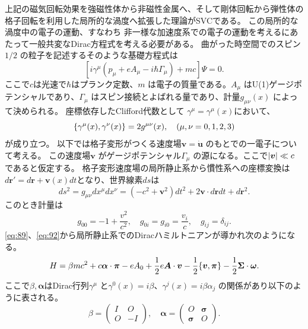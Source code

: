 \documentclass[dvipdfmx]{jsreport}
\numberwithin{equation}{chapter}
\numberwithin{table}{chapter}
\begin{document}
上記の磁気回転効果を強磁性体から非磁性金属へ、そして剛体回転から弾性体の格子回転を利用した局所的な渦度へ拡張した理論がSVCである。
この局所的な渦度中の電子の運動、すなわち
非一様な加速度系での電子の運動を考えるにあたって一般共変なDirac方程式を考える必要がある。
曲がった時空間でのスピン$1 /2$ の粒子を記述するそのような基礎方程式は
\begin{equation}
\label{eq:89}
	\left[ i \gamma^{\mu}(p_{\mu}+eA_{\mu}-i\hbar \Gamma_{\mu})+mc \right] \Psi =0
.\end{equation}
ここで$c$は光速で$\hbar$はプランク定数、$m$ は電子の質量である。$A_{\mu}$ はU(1)ゲージポテンシャルであり、$\Gamma_{\mu}$ はスピン接続とよばれる量であり、計量$g_{\mu\nu}(x)$ によって決められる。
座標依存したClifford代数として
$\gamma^{\mu}=\gamma^{\mu}(x)$において、
\begin{equation}
\label{eq:90}
\acomm{\gamma^{\mu}(x)}{\gamma^{\nu}(x)}=2g^{\mu\nu}(x),\quad(\mu,\nu=0,1,2,3)
\end{equation}
が成り立つ。
以下では格子変形がつくる速度場$\bm{v}=\dot{\bm{u}}$ のもとでの一電子について考える。
この速度場$\bm{v}$ がゲージポテンシャル$\Gamma_{\mu}$ の源になる。ここで$\abs{\bm{v}}\ll c$ であると仮定する。
格子変形速度場の局所静止系から慣性系への座標変換は$d\bm{r}'=d\bm{r}+\bm{v}(x)dt$となり、世界線素$ds$は
\begin{equation}
\label{eq:91}
	ds^2=g_{\mu\nu}dx^{\mu}dx^{\nu}=(-c^2+\bm{v}^2)dt^2+2\bm{v}\cdot d\bm{r} dt + d\bm{r}^2
.\end{equation}
このとき計量は
\begin{equation}
\label{eq:92}
	g_{00}=-1+\frac{v^2}{c^2},\quad g_{0i}=g_{i0}=\frac{v_i}{c},\quad g_{ij}=\delta_{ij}
.\end{equation}
\eqref{eq:89}、\eqref{eq:92}から局所静止系でのDiracハミルトニアンが導かれ次のようになる。\cite{physrevb.96.020401}
\begin{equation}
\label{eq:93}
	H=\beta m c^2+c \bm{\alpha}\cdot \bm{\pi }-eA_0+\frac{1}{2}e \bm{A}\cdot \bm{v}-\frac{1}{2}\acomm{\bm{v}}{\bm{\pi }}-\frac{1}{2}\bm{\Sigma}\cdot  \bm{\omega}
.\end{equation}
ここで$\beta,\bm{\alpha}$はDirac行列$\gamma^{\mu}$ と$\gamma^{0}(x)=i\beta$、$\gamma^{j}(x)=i\beta\alpha_{j}$ の関係があり以下のように表される。
\begin{equation}
\label{eq:94}
\beta = \begin{pmatrix}I &O\\O&-I  \end{pmatrix},\quad \bm{\alpha}=\begin{pmatrix} O&\bm{\sigma} \\ \bm{\sigma}&O\end{pmatrix} 
.\end{equation}
\end{document}
